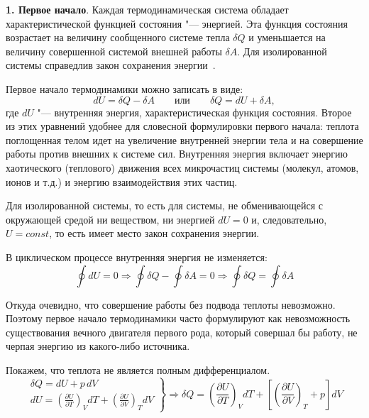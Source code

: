 \documentclass[12pt,a4paper,oneside]{book}
\begin{document}
{\bf 1. Первое начало}.
Каждая термодинамическая система обладает характеристической функцией состояния "--- энергией. Эта функция состояния возрастает на величину сообщенного системе тепла $\delta Q$ и уменьшается на величину совершенной системой внешней работы $\delta A$. Для изолированной системы справедлив закон сохранения энергии~\cite{Osipov1999a}.

Первое начало термодинамики можно записать в виде:
\begin{equation}
	d U = \delta Q - \delta A \qquad \text{или} \qquad \delta Q = d U + \delta A,
\end{equation}
где $d U$ "--- внутренняя энергия, характеристическая функция состояния. Второе из этих уравнений удобнее для словесной формулировки первого начала: теплота поглощенная телом идет на увеличение внутренней энергии тела и  на совершение работы против внешних к системе сил. Внутренняя энергия включает энергию хаотического (теплового) движения всех микрочастиц системы (молекул, атомов, ионов и т.д.) и энергию взаимодействия этих частиц.

Для изолированной системы, то есть для системы, не обменивающейся с окружающей средой ни веществом, ни энергией $dU = 0$ и, следовательно, $U = const$, то есть имеет место закон сохранения энергии.

В циклическом процессе внутренняя энергия не изменяется:
\begin{equation}
	\oint d U = 0 \Rightarrow \oint \delta Q - \oint \delta A
		= 0 \Rightarrow \oint \delta Q = \oint \delta A
\end{equation}

Откуда очевидно, что совершение работы без подвода теплоты невозможно. Поэтому первое начало термодинамики часто формулируют как невозможность существования вечного двигателя первого рода, который совершал бы работу, не черпая энергию из какого-либо источника.

Покажем, что теплота не является полным дифференциалом.
\begin{equation}
	\label{eq316.1}
\left. \begin{aligned}
\delta Q =dU + p\,dV\\
dU = \left( \frac{\partial U }{\partial T} \right)_{\!\! V} \!\!\! dT + \left( \frac{\partial U }{\partial V} \right)_{\!\! T} \!\!\! dV 
\end{aligned}
\right\rbrace \Rightarrow \delta Q = \left( \frac{\partial U }{\partial T} \right)_{\!\! V} \!\! dT + \left[\! \left( \frac{\partial U }{\partial V} \right)_{\! T}\!\!\! + p \right] \! dV
\end{equation}
\end{document}
